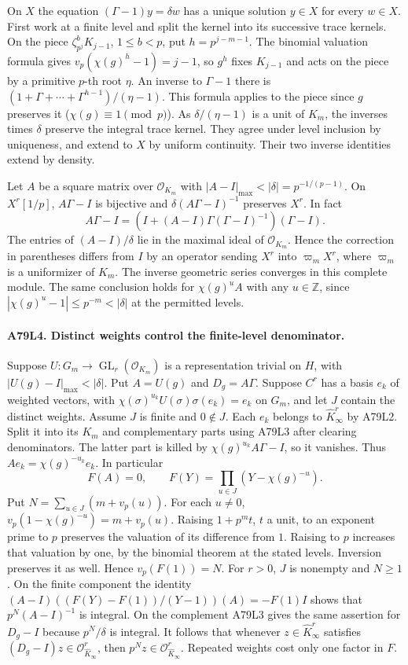 On $X$ the equation $(\Gamma-1)y=\delta w$ has a unique solution
$y\in X$ for every $w\in X$. First work at a finite level and split
the kernel into its successive trace kernels. On the piece
$\zeta_{p^j}^b K_{j-1}$, $1\le b<p$, put $h=p^{j-m-1}$.
The binomial valuation formula gives
$v_p(\chi(g)^h-1)=j-1$, so $g^h$ fixes $K_{j-1}$ and acts on
the piece by a primitive $p$-th root $\eta$. An inverse to
$\Gamma-1$ there is $(1+\Gamma+\cdots+\Gamma^{h-1})/(\eta-1)$.
This formula applies to the piece since $g$ preserves it
($\chi(g)\equiv1\pmod p$). As $\delta/(\eta-1)$ is a unit of
$K_m$, the inverses times $\delta$ preserve the integral trace kernel.
They agree under level inclusion by uniqueness, and extend to $X$
by uniform continuity. Their two inverse identities extend by density.

Let $A$ be a square matrix over $\mathcal O_{K_m}$ with
$|A-I|_{\max}<|\delta|=p^{-1/(p-1)}$. On $X^r[1/p]$,
$A\Gamma-I$ is bijective and $\delta(A\Gamma-I)^{-1}$ preserves
$X^r$. In fact
\[
 A\Gamma-I=(I+(A-I)\Gamma(\Gamma-I)^{-1})(\Gamma-I).
\]
The entries of $(A-I)/\delta$ lie in the maximal ideal of
$\mathcal O_{K_m}$. Hence the correction in parentheses differs
from $I$ by an operator sending $X^r$ into $\varpi_m X^r$, where
$\varpi_m$ is a uniformizer of $K_m$. The inverse geometric series
converges in this complete module. The same conclusion holds for
$\chi(g)^u A$ with any $u\in\mathbb Z$, since
$|\chi(g)^u-1|\le p^{-m}<|\delta|$ at the permitted levels.

\paragraph{A79L4. Distinct weights control the finite-level denominator.}
Suppose $U:G_m\to\operatorname{GL}_r(\mathcal O_{K_m})$ is a
representation trivial on $H$, with $|U(g)-I|_{\max}<|\delta|$.
Put $A=U(g)$ and $D_g=A\Gamma$. Suppose $C^r$ has a basis
$e_k$ of weighted vectors, with
$\chi(\sigma)^{u_k}U(\sigma)\sigma(e_k)=e_k$ on $G_m$, and
let $J$ contain the distinct weights. Assume $J$ is finite and
$0\notin J$. Each $e_k$ belongs to $\widehat K_\infty^r$ by A79L2.
Split it into its $K_m$ and complementary parts using A79L3 after
clearing denominators. The latter part is killed by
$\chi(g)^{u_k}A\Gamma-I$, so it vanishes. Thus
$Ae_k=\chi(g)^{-u_k}e_k$. In particular
\[
 F(A)=0,\qquad F(Y)=\prod_{u\in J}(Y-\chi(g)^{-u}).
\]
Put $N=\sum_{u\in J}(m+v_p(u))$. For each $u\ne0$,
$v_p(1-\chi(g)^{-u})=m+v_p(u)$. Raising $1+p^m t$, $t$ a unit,
to an exponent prime to $p$ preserves the valuation of its difference
from $1$. Raising to $p$ increases that valuation by one, by the
binomial theorem at the stated levels. Inversion preserves it as well.
Hence $v_p(F(1))=N$. For $r>0$, $J$ is nonempty and $N\ge1$.
On the finite component the identity
$(A-I)((F(Y)-F(1))/(Y-1))(A)=-F(1)I$ shows that
$p^N(A-I)^{-1}$ is integral. On the complement A79L3 gives the
same assertion for $D_g-I$ because $p^N/\delta$ is integral.
It follows that whenever $z\in\widehat K_\infty^r$ satisfies
$(D_g-I)z\in\mathcal O_{\widehat K_\infty}^r$, then
$p^Nz\in\mathcal O_{\widehat K_\infty}^r$. Repeated weights cost
only one factor in $F$.

